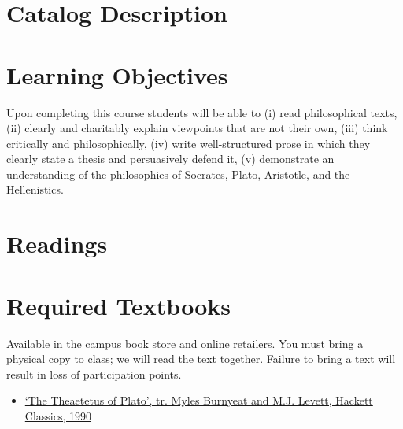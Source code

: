 \documentclass[article,oneside]{memoir}
\begin{document}
\section{Catalog Description}

 

\section{Learning Objectives}

Upon completing this course students will be able to (i) read
philosophical texts, (ii) clearly and charitably explain viewpoints that
are not their own, (iii) think critically and philosophically, (iv)
write well-structured prose in which they clearly state a thesis and
persuasively defend it, (v) demonstrate an understanding of the
philosophies of Socrates, Plato, Aristotle, and the Hellenistics.


\section{Readings}
\section{Required Textbooks}

Available in the campus book store and online retailers. You must bring a physical copy to class; we will read the text together. Failure to bring a text will result in loss of participation points. 

\begin{itemize}
\item \href{https://www.amazon.com/Theaetetus-Plato-Hackett-Classics/dp/0915144816/ref=sr_1_2?s=books&ie=UTF8&qid=1533665731&sr=1-2}{`The Theaetetus of Plato', tr. Myles Burnyeat and M.J. Levett, Hackett Classics, 1990}
\end{itemize}


\end{document}
